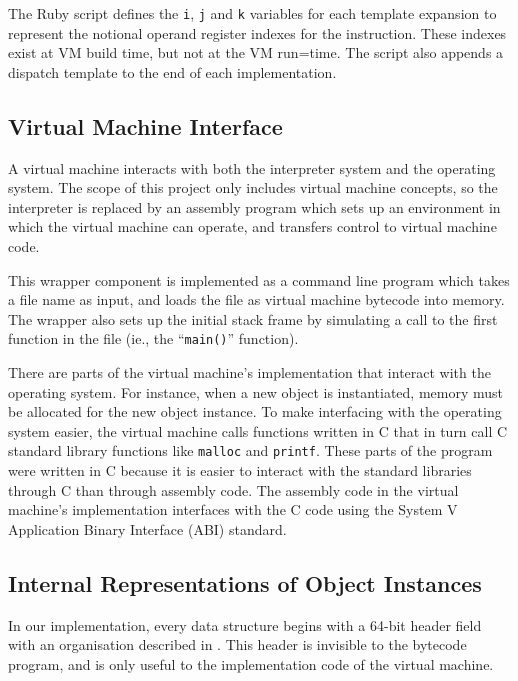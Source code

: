 		The Ruby script defines the \texttt{i}, \texttt{j} and \texttt{k} variables for each template expansion to represent the notional operand register indexes for the instruction. These indexes exist at VM build time, but not at the VM run=time. The script also appends a dispatch template to the end of each implementation.
		
		\subsection{Virtual Machine Interface}
		A virtual machine interacts with both the interpreter system and the operating system. The scope of this project only includes virtual machine concepts, so the interpreter is replaced by an assembly program which sets up an environment in which the virtual machine can operate, and transfers control to virtual machine code. 
		
		This wrapper component is implemented as a command line program which takes a file name as input, and loads the file as virtual machine bytecode into memory. The wrapper also sets up the initial stack frame by simulating a call to the first function in the file (ie., the ``\texttt{main()}'' function).
		
		There are parts of the virtual machine's implementation that interact with the operating system. For instance, when a new object is instantiated, memory must be allocated for the new object instance. To make interfacing with the operating system easier, the virtual machine calls functions written in C that in turn call C standard library functions like \texttt{malloc} and \texttt{printf}. These parts of the program were written in C because it is easier to interact with the standard libraries through C than through assembly code. The assembly code in the virtual machine's implementation interfaces with the C code using the System V Application Binary Interface (ABI) standard.
		
		\subsection{Internal Representations of Object Instances}
		In our implementation, every data structure begins with a 64-bit header field with an organisation described in . This header is invisible to the bytecode program, and is only useful to the implementation code of the virtual machine.
		
